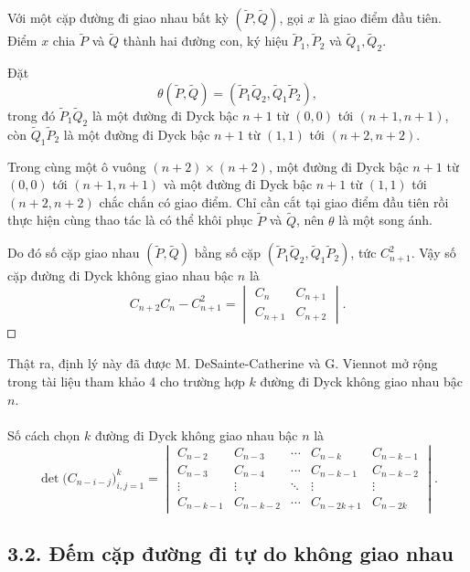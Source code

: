 \documentclass[11pt]{article}
\newcommand{\square}{\mathord{\vcenter{\hrule height .5pt
  \hbox{\vrule width .5pt height 5pt\kern5pt\vrule width .5pt}
  \hrule height .5pt}}}
\begin{document}
Với một cặp đường đi giao nhau bất kỳ \((\widetilde P,\widetilde Q)\), gọi
\(x\) là giao điểm đầu tiên. Điểm \(x\) chia \(\widetilde P\) và
\(\widetilde Q\) thành hai đường con, ký hiệu
\(\widetilde P_1,\widetilde P_2\) và
\(\widetilde Q_1,\widetilde Q_2\).

Đặt
\[
  \theta(\widetilde P,\widetilde Q)
  =(\widetilde P_1\widetilde Q_2,\widetilde Q_1\widetilde P_2),
\]
trong đó \(\widetilde P_1\widetilde Q_2\) là một đường đi Dyck bậc \(n+1\) từ
\((0,0)\) tới \((n+1,n+1)\), còn \(\widetilde Q_1\widetilde P_2\) là một đường
đi Dyck bậc \(n+1\) từ \((1,1)\) tới \((n+2,n+2)\).

Trong cùng một ô vuông \((n+2)\times(n+2)\), một đường đi Dyck bậc \(n+1\) từ
\((0,0)\) tới \((n+1,n+1)\) và một đường đi Dyck bậc \(n+1\) từ \((1,1)\) tới
\((n+2,n+2)\) chắc chắn có giao điểm. Chỉ cần cắt tại giao điểm đầu tiên rồi
thực hiện cùng thao tác là có thể khôi phục \(\widetilde P\) và
\(\widetilde Q\), nên \(\theta\) là một song ánh.

Do đó số cặp giao nhau \((\widetilde P,\widetilde Q)\) bằng số cặp
\((\widetilde P_1\widetilde Q_2,\widetilde Q_1\widetilde P_2)\), tức
\(C_{n+1}^2\). Vậy số cặp đường đi Dyck không giao nhau bậc \(n\) là
\[
  C_{n+2}C_n-C_{n+1}^2
  =
  \begin{vmatrix}
    C_n & C_{n+1}\\
    C_{n+1} & C_{n+2}
  \end{vmatrix}.
\]
\(\square\)

Thật ra, định lý này đã được M. DeSainte-Catherine và G. Viennot mở rộng
trong tài liệu tham khảo 4 cho trường hợp \(k\) đường đi Dyck không giao nhau
bậc \(n\).

\paragraph{}
Số cách chọn \(k\) đường đi Dyck không giao nhau bậc \(n\) là
\[
  \det\bigl(C_{n-i-j}\bigr)_{i,j=1}^{k}
  =
  \begin{vmatrix}
    C_{n-2} & C_{n-3} & \cdots & C_{n-k} & C_{n-k-1}\\
    C_{n-3} & C_{n-4} & \cdots & C_{n-k-1} & C_{n-k-2}\\
    \vdots & \vdots & \ddots & \vdots & \vdots\\
    C_{n-k-1} & C_{n-k-2} & \cdots & C_{n-2k+1} & C_{n-2k}
  \end{vmatrix}. \tag{14}
\]

\subsection*{3.2. Đếm cặp đường đi tự do không giao nhau}
\end{document}
